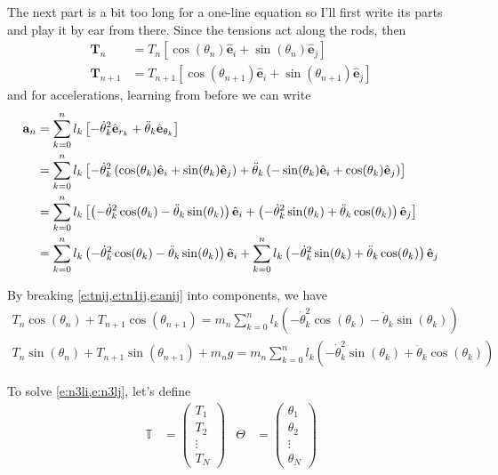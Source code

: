 \documentclass{article}
\newcommand{\vct}{\mathbf}     %
\newcommand{\uvc}[1]{\hat{\mathbf{#1}}} %
\newcommand{\erk}[1]{\uvc{e}_{r_{#1}}}      %
\newcommand{\etk}[1]{\uvc{e}_{\theta_{#1}}} %
\newcommand{\ei}{\uvc{e}_i}      %
\newcommand{\ej}{\uvc{e}_j}      %
\newcommand{\nt}{T}              %
\newcommand{\ntk}[1]{T_{#1}}              %
\newcommand{\vtk}[1]{\vct{\nt}_{#1}}      %
\newcommand{\va}{\vct{a}}        %
\newcommand{\allt}{\mathbb{T}}
\newcommand{\allq}{\Theta}
\begin{document}
The next part is a bit too long for a one-line equation so I'll first write its parts and play it by ear from there. Since the tensions act along the rods, then
\begin{align}
  \vtk{n}&=\ntk{n}\left[\cos(\theta_n)\ei+\sin(\theta_n)\ej\right] \label{e:tnij}\\
  \vtk{n+1}&=\ntk{n+1}\left[\cos(\theta_{n+1})\ei+\sin(\theta_{n+1})\ej\right] \label{e:tn1ij}
\end{align}
and for accelerations, learning from before we can write
\begin{align}
  \va_n&=\sum_{k=0}^{n}l_k\left[-\dot{\theta}_{k}^2\erk{k}+\ddot{\theta}_{k}\etk{k}\right]\notag\\
  &=\sum_{k=0}^{n}l_k\left[-\dot{\theta}_{k}^2\left(\cos(\theta_k)\ei+\sin(\theta_k)\ej\right)+\ddot{\theta}_{k}\left(-\sin(\theta_k)\ei+\cos(\theta_k)\ej\right)\right]\notag\\
  &=\sum_{k=0}^{n}l_k\left[\left(-\dot{\theta}_{k}^2\cos(\theta_k)-\ddot{\theta}_{k}\sin(\theta_k)\right)\ei+\left(-\dot{\theta}_{k}^2\sin(\theta_k)+\ddot{\theta}_{k}\cos(\theta_k)\right)\ej\right]\notag\\
  &=\sum_{k=0}^{n}l_k \left(-\dot{\theta}_{k}^2\cos(\theta_k)-\ddot{\theta}_{k}\sin(\theta_k)\right)\ei
  +
  \sum_{k=0}^{n}l_k \left(-\dot{\theta}_{k}^2\sin(\theta_k)+\ddot{\theta}_{k}\cos(\theta_k)\right)\ej \label{e:anij}
\end{align}

By breaking \cref{e:tnij,e:tn1ij,e:anij} into components, we have
\begin{gather}
  \ntk{n}\cos(\theta_{n})+\ntk{n+1}\cos(\theta_{n+1})
  =
  m_n\sum_{k=0}^n l_k \left(-\dot{\theta}_{k}^2\cos(\theta_k)-\ddot{\theta}_{k}\sin(\theta_k)\right)
  \label{e:n3li}
  \\
  \ntk{n}\sin(\theta_{n})+\ntk{n+1}\sin(\theta_{n+1})+m_ng
  =
  m_n\sum_{k=0}^{n}l_k \left(-\dot{\theta}_{k}^2\sin(\theta_k)+\ddot{\theta}_{k}\cos(\theta_k)\right)
  \label{e:n3lj}
\end{gather}

To solve \cref{e:n3li,e:n3lj}, let's define
\begin{align}
\allt&=
\begin{pmatrix}
  \ntk{1}\\
  \ntk{2}\\
  \vdots\\
  \ntk{N}
\end{pmatrix} 
& 
\allq&=
\begin{pmatrix}
  \theta_1\\
  \theta_2\\
  \vdots\\
  \theta_N
\end{pmatrix}
\end{align}
\end{document}
